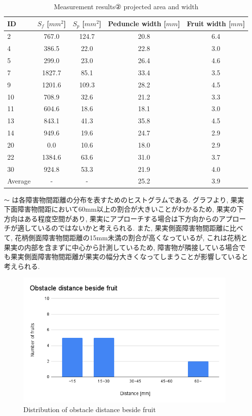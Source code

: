 \begin{table}[H]
  \begin{center}
    \begin{tabular}{l|cccc}
      ID & $S_f$ [$mm^2$] & $S_p$ [$mm^2$] & Peduncle width [$mm$] & Fruit width [$mm$]\\ \hline\hline
      2 & 767.0 & 124.7 & 20.8 & 6.4\\
      4 & 386.5 & 22.0 & 22.8 & 3.0\\
      5 & 299.0 & 23.0 & 26.4 & 4.6\\
      7 & 1827.7 & 85.1 & 33.4 & 3.5\\
      9 & 1201.6 & 109.3 & 28.2 & 4.5\\
      10 & 708.9 & 32.6 & 21.2 & 3.3\\
      11 & 604.6 & 18.6 & 18.1 & 3.0\\
      13 & 843.1 & 41.3 & 35.8 & 4.5\\
      14 & 949.6 & 19.6 & 24.7 & 2.9\\
      20 & 0.0 & 10.6 & 18.0 & 2.9\\
      22 & 1384.6 & 63.6 & 31.0 & 3.7\\
      30 & 924.8 & 53.3 & 21.9 & 4.0\\ \hline
      Average & - & - & 25.2 & 3.9\\
    \end{tabular}
    \caption{Measurement results② projected area and width}
    \label{Tab:measurementresults2}
  \end{center}
\end{table}

 \verb|〜|  は各障害物間距離の分布を表すためのヒストグラムである.
グラフより, 果実下面障害物間距において60mm以上の割合が大きいことがわかるため, 果実の下方向はある程度空間があり, 果実にアプローチする場合は下方向からのアプローチが適しているのではないかと考えられる.
また, 果実側面障害物間距離に比べて, 花柄側面障害物間距離の15mm未満の割合が高くなっているが, これは花柄と果実の内部を含まずに中心から計測しているため, 障害物が隣接している場合でも果実側面障害物間距離が果実の幅分大きくなってしまうことが影響していると考えられる.

\vspace{5mm}
\begin{figure}[H]
     \centering
     \includegraphics[width=110mm]{images/png/resultbesidef.png}
     \caption{Distribution of obstacle distance beside fruit}
     \label{Fig:resultbesidef}
\end{figure}

